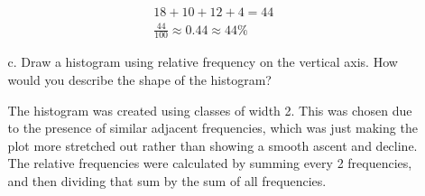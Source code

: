 \documentclass[letterpaper,12pt]{article}
\begin{document}
\begin{enumerate}
\begin{enumerate}
        \begin{align*}
          18 + 10 + 12 + 4 = 44 \\
          \frac{44}{100} \approx 0.44 \approx 44\%
        \end{align*}
      \item[c.]
        Draw a histogram using relative frequency on the vertical axis. How would you describe the shape of the histogram?
        \begin{center}
        \end{center}
        The histogram was created using classes of width 2. This was chosen due to the presence of similar adjacent frequencies, which was just making the plot more stretched out rather than showing a smooth ascent and decline. The relative frequencies were calculated by summing every 2 frequencies, and then dividing that sum by the sum of all frequencies.


\end{enumerate}
\end{enumerate}
\end{document}

